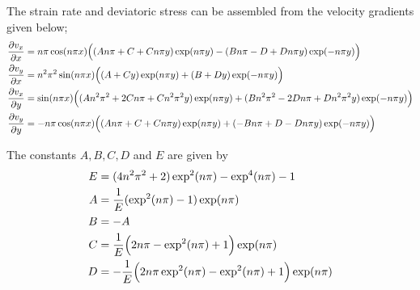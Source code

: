 The strain rate and deviatoric stress can be assembled from the velocity gradients given below; 
\begin{align}
	\frac{\partial v_x}{\partial x} 
	&= n \pi \cos(n \pi x) \Bigl( 
			( A n \pi + C + C n \pi y) \exp(n \pi y) 
			- ( B n \pi - D + D n \pi y) \exp(-n \pi y) 
			\Bigr)	\\
%
	\frac{\partial v_y}{\partial x} 
	&= n^2 \pi^2 \sin(n \pi x) \Bigl( 
		( A + C y ) \exp(n \pi y) 
		+ ( B + D y ) \exp(-n \pi y) 
		\Bigr)	\\
%
	\frac{\partial v_x}{\partial y} 
	&= \sin(n \pi x) \Bigl( 
		( A n^2 \pi^2 + 2 C n \pi + C n^2 \pi^2 y ) \exp(n \pi y) 
		+ ( B n^2 \pi^2 - 2 D n \pi + D n^2 \pi^2 y ) \exp(-n \pi y) 
		\Bigr)	\\
%
	\frac{\partial v_y}{\partial y} 
	&= - n \pi \cos(n \pi x) \Bigl( 
		( A n \pi + C + C n \pi y ) \exp(n \pi y) 
		+ ( -B n \pi + D - D n \pi y ) \exp(-n \pi y) 
		\Bigr)	\\
\end{align}


The constants $A, B, C, D$ and $E$ are given by
\begin{align}
	E &= (4 n^2 \pi^2 + 2 ) \exp^2( n \pi ) - \exp^4( n \pi ) - 1	\\
%	
	A &=  \frac{1}{E} ( \exp^2( n \pi ) - 1 ) \exp( n \pi )	\\
	B &= - A	\\
%	
	C &=   \frac{1}{E} \Bigl( 2 n \pi - \exp^2( n \pi ) + 1 \Bigr) \exp( n \pi )	\\
	D &= - \frac{1}{E} \Bigl(  2 n \pi \exp^2( n \pi ) - \exp^2( n \pi ) + 1 \Bigr) \exp( n \pi )
\end{align}









